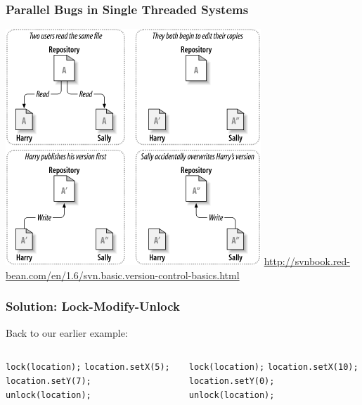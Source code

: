 \begin{frame}
\frametitle{Parallel Bugs in Single Threaded Systems}
\begin{changemargin}{1cm}

\begin{center}
	\includegraphics[width=.5\textwidth]{images/ch02dia2.png}
	\hfill {\tiny \url{http://svnbook.red-bean.com/en/1.6/svn.basic.version-control-basics.html}}
\end{center} 

\end{changemargin}
\end{frame}

\begin{frame}
\frametitle{Solution: Lock-Modify-Unlock}
\begin{changemargin}{1cm}

Back to our earlier example:

\begin{columns}


		\texttt{lock(location);} 
		\texttt{location.setX(5);}
		\texttt{location.setY(7);}
		\texttt{unlock(location);}
		

		\texttt{lock(location);} 
		\texttt{location.setX(10);}
		\texttt{location.setY(0);}
		\texttt{unlock(location);}

\end{columns}

\end{changemargin}
\end{frame}



